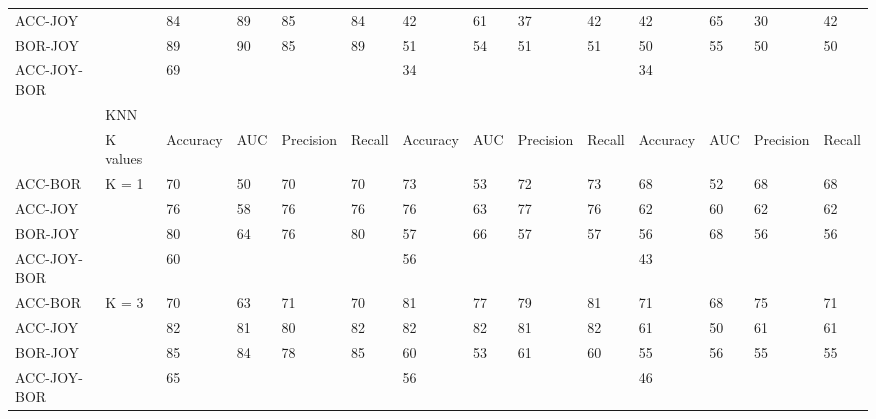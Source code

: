 \begin{sidewaystable}[]
{\begin{tabular}{llllllllllllll}
		ACC-JOY     &                             & 84       & 89  & 85        & 84     & 42            & 61       & 37             & 42          & 42       & 65  & 30        & 42     \\
		BOR-JOY     &                             & 89       & 90  & 85        & 89     & 51            & 54       & 51             & 51          & 50       & 55  & 50        & 50     \\
		ACC-JOY-BOR &                             & 69       &     &           &        & 34            &          &                &             & 34       &     &           &        \\ \hline
		            & KNN                            \\ 
		& K values               & Accuracy & AUC & Precision & Recall & Accuracy       & AUC      & Precision      & Recall      & Accuracy & AUC & Precision & Recall \\ \hline
		ACC-BOR     & \multirow{4}{*}{K = 1} & 70       & 50  & 70        & 70     & 73             & 53       & 72             & 73          & 68       & 52  & 68        & 68     \\
		ACC-JOY     &                        & 76       & 58  & 76        & 76     & 76             & 63       & 77             & 76          & 62       & 60  & 62        & 62     \\
		BOR-JOY     &                        & 80       & 64  & 76        & 80     & 57             & 66       & 57             & 57          & 56       & 68  & 56        & 56     \\
		ACC-JOY-BOR &                        & 60       &     &           &        & 56             &          &                &             & 43       &     &           &        \\
		ACC-BOR     & \multirow{4}{*}{K = 3} & 70       & 63  & 71        & 70     & 81             & 77       & 79             & 81          & 71       & 68  & 75        & 71     \\
		ACC-JOY     &                        & 82       & 81  & 80        & 82     & 82             & 82       & 81             & 82          & 61       & 50  & 61        & 61     \\
		BOR-JOY     &                        & 85       & 84  & 78        & 85     & 60             & 53       & 61             & 60          & 55       & 56  & 55        & 55     \\
		ACC-JOY-BOR &                        & 65       &     &           &        & 56             &          &                &             & 46       &     &           &        \\

\end{tabular}}
\end{sidewaystable}
